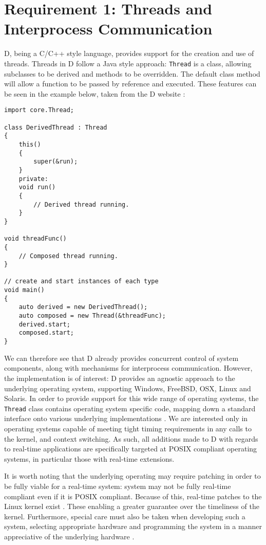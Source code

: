 \section{Requirement 1: Threads and Interprocess Communication}
D, being a C/C++ style language, provides support for the creation and use of 
threads. Threads in D follow a Java style approach: \texttt{Thread} is a class, 
allowing subclasses to be derived and methods to be overridden. The default 
class method will allow a function to be passed by reference and executed. 
These features can be seen in the example below, taken from the D website
\cite{core-thread}: 
\begin{lstlisting}
import core.Thread; 

class DerivedThread : Thread
{
    this()
    {
        super(&run);
    }
    private:
    void run()
    {
        // Derived thread running.
    }
}

void threadFunc()
{
    // Composed thread running.
}

// create and start instances of each type
void main()
{
    auto derived = new DerivedThread();
    auto composed = new Thread(&threadFunc);
    derived.start; 
    composed.start;
}
\end{lstlisting}
We can therefore see that D already provides 
concurrent control of system components, along with mechanisms for 
interprocess communication. However, the implementation is of interest: D 
provides an agnostic approach to the underlying operating system, supporting 
Windows, FreeBSD, OSX, Linux and Solaris. 
In order to provide support for this wide range of operating systems, the 
\texttt{Thread}
class contains operating system specific code, mapping down a standard interface 
onto various underlying implementations 
\cite{github-core-thread}. 
We are interested only in operating systems capable of meeting tight timing 
requirements in any calls to the kernel, and context switching.
As such, all additions made to D with regards to real-time applications are 
specifically targeted at POSIX compliant 
operating systems, in particular those with real-time extensions. 
\par\bigskip\noindent
It is worth noting that the underlying operating may require patching in order 
to be fully viable for a real-time system: system may not be fully
real-time compliant even if it is POSIX compliant. Because of this, real-time patches 
to the Linux kernel exist \cite{rt-wiki}. These enabling a greater 
guarantee over the timeliness of the kernel. 
Furthermore, special care must also be taken when developing such a system,
selecting appropriate hardware and programming the system in a manner appreciative 
of the underlying hardware \cite{rt-wiki-how-to}.

